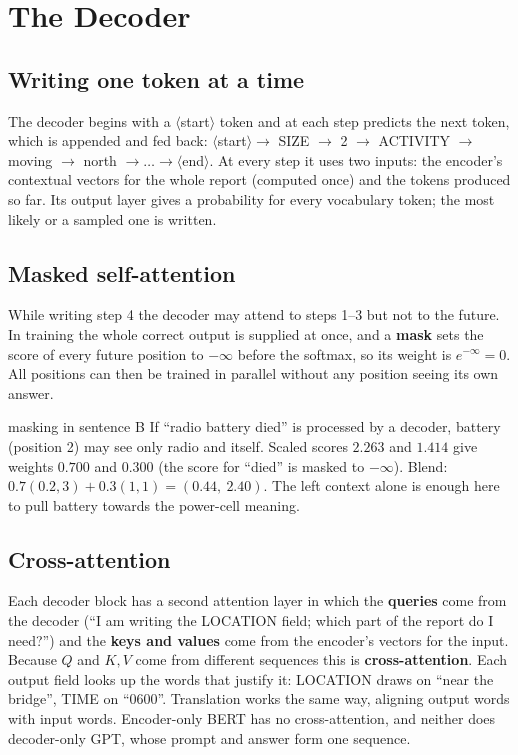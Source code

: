 \documentclass[11pt]{article}
\begin{document}
\section{The Decoder}
\subsection{Writing one token at a time}
The decoder begins with a $\langle$start$\rangle$ token and at each step predicts the next token, which is appended and fed back: $\langle$start$\rangle\to$ SIZE $\to$ 2 $\to$ ACTIVITY $\to$ moving $\to$ north $\to\dots\to\langle$end$\rangle$. At every step it uses two inputs: the encoder's contextual vectors for the whole report (computed once) and the tokens produced so far. Its output layer gives a probability for every vocabulary token; the most likely or a sampled one is written.

\subsection{Masked self-attention}
While writing step 4 the decoder may attend to steps 1--3 but not to the future. In training the whole correct output is supplied at once, and a \textbf{mask} sets the score of every future position to $-\infty$ before the softmax, so its weight is $e^{-\infty}=0$. All positions can then be trained in parallel without any position seeing its own answer.
\begin{example}{masking in sentence B}
If ``radio battery died'' is processed by a decoder, battery (position 2) may see only radio and itself. Scaled scores $2.263$ and $1.414$ give weights $0.700$ and $0.300$ (the score for ``died'' is masked to $-\infty$). Blend: $0.7(0.2,3)+0.3(1,1)=(0.44,\ 2.40)$. The left context alone is enough here to pull battery towards the power-cell meaning.
\end{example}

\subsection{Cross-attention}
Each decoder block has a second attention layer in which the \textbf{queries} come from the decoder (``I am writing the LOCATION field; which part of the report do I need?'') and the \textbf{keys and values} come from the encoder's vectors for the input. Because $Q$ and $K,V$ come from different sequences this is \textbf{cross-attention}. Each output field looks up the words that justify it: LOCATION draws on ``near the bridge'', TIME on ``0600''. Translation works the same way, aligning output words with input words. Encoder-only BERT has no cross-attention, and neither does decoder-only GPT, whose prompt and answer form one sequence.
\end{document}

